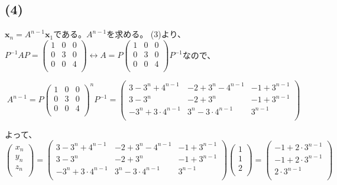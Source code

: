 \documentclass[]{jsarticle}
\begin{document}
    \subsection*{(4)}
        $\mathbf{x}_n = A^{n - 1}\mathbf{x}_1$である。$A^{n - 1}$を求める。
        (3)より、$
            P^{-1}AP = \begin{pmatrix}
                1 & 0 & 0 \\
                0 & 3 & 0 \\
                0 & 0 & 4 \\
            \end{pmatrix} \leftrightarrow A = P\begin{pmatrix}
                1 & 0 & 0 \\
                0 & 3 & 0 \\
                0 & 0 & 4 \\
            \end{pmatrix}P^{-1}
        $なので、

    \begin{equation*}
        A^{n - 1} = P\begin{pmatrix}
            1 & 0 & 0 \\
            0 & 3 & 0 \\
            0 & 0 & 4 \\
        \end{pmatrix}^nP^{-1} = \begin{pmatrix}
            3 - 3^n + 4^{n - 1} & -2 + 3^n - 4 ^{n - 1} & -1 + 3^{n - 1} \\
            3 - 3^n & -2 + 3^n & -1 + 3^{n - 1} \\
            -3^n + 3\cdot 4^{n - 1} & 3^n - 3\cdot 4^{n - 1} & 3^{n - 1} \\
        \end{pmatrix}
    \end{equation*}

    よって、$
        \begin{pmatrix}
            x_n \\
            y_n \\
            z_n \\
        \end{pmatrix} = \begin{pmatrix}
            3 - 3^n + 4^{n - 1} & -2 + 3^n - 4 ^{n - 1} & -1 + 3^{n - 1} \\
            3 - 3^n & -2 + 3^n & -1 + 3^{n - 1} \\
            -3^n + 3\cdot 4^{n - 1} & 3^n - 3\cdot 4^{n - 1} & 3^{n - 1} \\
        \end{pmatrix}\begin{pmatrix}
            1 \\
            1 \\
            2 \\
        \end{pmatrix} = \begin{pmatrix}
            -1 + 2\cdot 3^{n - 1} \\
            -1 + 2\cdot 3^{n - 1} \\
            2\cdot 3^{n - 1} \\
        \end{pmatrix}
    $
\end{document}
